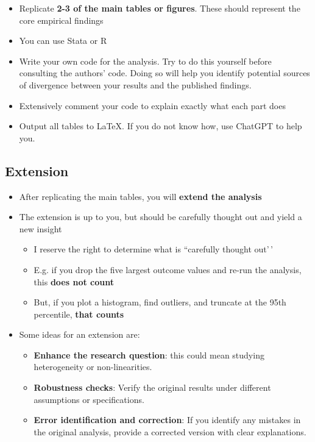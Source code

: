 \documentclass[
]{article}
\providecommand{\tightlist}{%
  \setlength{\itemsep}{0pt}\setlength{\parskip}{0pt}}
\begin{document}
\begin{itemize}
\tightlist
\item
  Replicate \textbf{2-3 of the main tables or figures}. These should represent the core empirical findings
\item
  You can use Stata or R
\item
  Write your own code for the analysis. Try to do this yourself before consulting the authors' code. Doing so will help you identify potential sources of divergence between your results and the published findings.
\item
  Extensively comment your code to explain exactly what each part does
\item
  Output all tables to LaTeX. If you do not know how, use ChatGPT to help you.
\end{itemize}

\hypertarget{extension}{%
\subsection{Extension}\label{extension}}

\begin{itemize}
\tightlist
\item
  After replicating the main tables, you will \textbf{extend the analysis}
\item
  The extension is up to you, but should be carefully thought out and yield a new insight

  \begin{itemize}
  \tightlist
  \item
    I reserve the right to determine what is ``carefully thought out'\,'
  \item
    E.g. if you drop the five largest outcome values and re-run the analysis, this \textbf{does not count}
  \item
    But, if you plot a histogram, find outliers, and truncate at the 95th percentile, \textbf{that counts}
  \end{itemize}
\item
  Some ideas for an extension are:

  \begin{itemize}
  \tightlist
  \item
    \textbf{Enhance the research question}: this could mean studying heterogeneity or non-linearities.
  \item
    \textbf{Robustness checks}: Verify the original results under different assumptions or specifications.
  \item
    \textbf{Error identification and correction}: If you identify any mistakes in the original analysis, provide a corrected version with clear explanations.
  \end{itemize}
\end{itemize}
\end{document}

